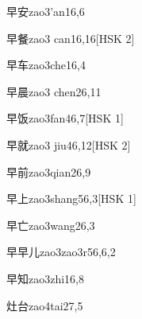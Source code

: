\begin{entry}{早安}{zao3'an1}{6,6}
\end{entry}

\begin{entry}{早餐}{zao3 can1}{6,16}[HSK 2]
\end{entry}

\begin{entry}{早车}{zao3che1}{6,4}
\end{entry}

\begin{entry}{早晨}{zao3 chen2}{6,11}
\end{entry}

\begin{entry}{早饭}{zao3fan4}{6,7}[HSK 1]
\end{entry}

\begin{entry}{早就}{zao3 jiu4}{6,12}[HSK 2]
\end{entry}

\begin{entry}{早前}{zao3qian2}{6,9}
\end{entry}

\begin{entry}{早上}{zao3shang5}{6,3}[HSK 1]
\end{entry}

\begin{entry}{早亡}{zao3wang2}{6,3}
\end{entry}

\begin{entry}{早早儿}{zao3zao3r5}{6,6,2}
\end{entry}

\begin{entry}{早知}{zao3zhi1}{6,8}
\end{entry}

\begin{entry}{灶台}{zao4tai2}{7,5}
\end{entry}

